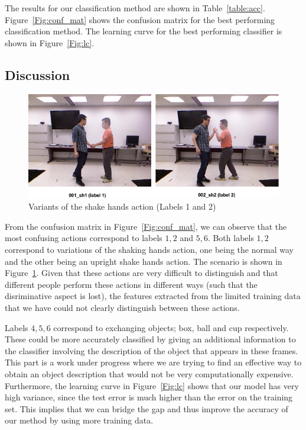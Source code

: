 \documentclass[10pt,twocolumn,letterpaper]{article}
\begin{document}
The results for our classification method are shown in Table~\ref{table:acc}. Figure~\ref{Fig:conf_mat} shows the confusion matrix for the best performing classification method. The learning curve for the best performing classifier is shown in Figure~\ref{Fig:lc}.

\subsection*{Discussion}

\begin{figure}[ht]
\centering
\includegraphics[scale=0.3]{sh_conf.png}
\caption{Variants of the shake hands action (Labels 1 and 2)}
\label{Fig:sh_conf}
\end{figure}
From the confusion matrix in Figure~\ref{Fig:conf_mat}, we can observe that the most confusing actions correspond to labels ${1,2}$ and ${5,6}$. Both labels ${1,2}$ correspond  to variations of the shaking hands action, one being the normal way and the other being an upright shake hands action. The scenario is shown in Figure~\ref{Fig:sh_conf}. Given that these actions are very difficult to distinguish and that different people perform these actions in different ways (such that the disriminative aspect is lost), the features extracted from the limited training data that we have could not clearly distinguish between these actions. 

Labels ${4,5,6}$ correspond to exchanging objects; box, ball and cup respectively. These could be more accurately classified by giving an additional information to the classifier involving the description of the object that appears in these frames. This part is a work under progress where we are trying to find an effective way to obtain an object description that would not be very computationally expensive. 
Furthermore, the learning curve in Figure~\ref{Fig:lc} shows that our model has very high variance, since the test error is much higher than the error on the training set. This implies that we can bridge the gap and thus improve the accuracy of our method by using more training data. 
\end{document}
